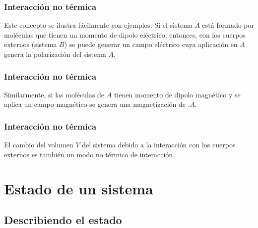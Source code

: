 \documentclass[12pt]{beamer}
\begin{document}
\begin{frame}
\frametitle{Interacción no térmica}
Este concepto se ilustra fácilmente con ejemplos: \pause Si el sistema $A$ está formado por moléculas que tienen un momento de dipolo
eléctrico, \pause entonces, con los cuerpos externos (sistema $B$) se puede generar un campo eléctrico cuya aplicación en $A$ genera la polarización del sistema $A$.
\end{frame}
\begin{frame}
\frametitle{Interacción no térmica}
Similarmente, si las moléculas de $A$ tienen momento de dipolo magnético y se aplica un campo magnético se genera una magnetización de .$A$.
\end{frame}
\begin{frame}
\frametitle{Interacción no térmica}
El cambio del volumen $V$ del sistema debido a la interacción con los cuerpos externos es también un modo no térmico de interacción.
\end{frame}

\section{Estado de un sistema}
\subsection{Describiendo el estado}
\end{document}
